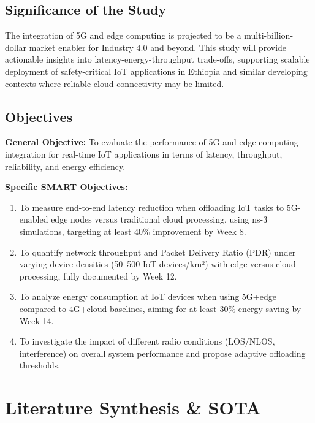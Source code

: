 \documentclass[12pt,a4paper]{article}
\begin{document}
\subsection{Significance of the Study}
The integration of 5G and edge computing is projected to be a multi-billion-dollar market enabler for Industry 4.0 and beyond. This study will provide actionable insights into latency-energy-throughput trade-offs, supporting scalable deployment of safety-critical IoT applications in Ethiopia and similar developing contexts where reliable cloud connectivity may be limited.

\subsection{Objectives}
\textbf{General Objective:} To evaluate the performance of 5G and edge computing integration for real-time IoT applications in terms of latency, throughput, reliability, and energy efficiency.

\textbf{Specific SMART Objectives:}
\begin{enumerate}[leftmargin=*]
    \item To measure end-to-end latency reduction when offloading IoT tasks to 5G-enabled edge nodes versus traditional cloud processing, using ns-3 simulations, targeting at least 40\% improvement by Week 8.
    \item To quantify network throughput and Packet Delivery Ratio (PDR) under varying device densities (50–500 IoT devices/km²) with edge versus cloud processing, fully documented by Week 12.
    \item To analyze energy consumption at IoT devices when using 5G+edge compared to 4G+cloud baselines, aiming for at least 30\% energy saving by Week 14.
    \item To investigate the impact of different radio conditions (LOS/NLOS, interference) on overall system performance and propose adaptive offloading thresholds.
\end{enumerate}

\section{Literature Synthesis \& SOTA}
\end{document}
